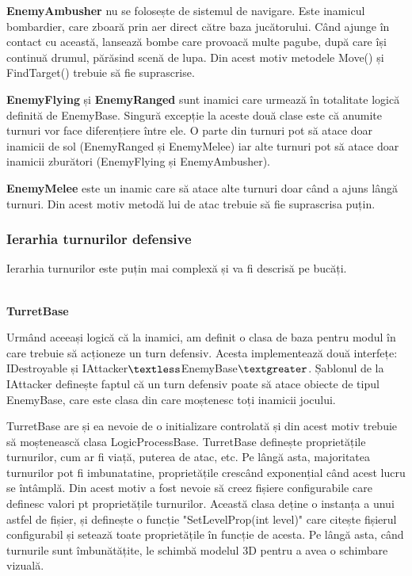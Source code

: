 \documentclass[12pt, a4paper]{article}
\begin{document}
	\textbf{EnemyAmbusher} nu se folosește de sistemul de navigare. Este inamicul bombardier, care zboară prin aer direct către baza jucătorului. Când ajunge în contact cu această, lansează bombe care provoacă multe pagube, după care își continuă drumul, părăsind scenă de lupa. Din acest motiv metodele Move() și FindTarget() trebuie să fie suprascrise.
	\newline
	
	\textbf{EnemyFlying} și \textbf{EnemyRanged} sunt inamici care urmează în totalitate logică definită de EnemyBase. Singură excepție la aceste două clase este că anumite turnuri vor face diferențiere între ele. O parte din turnuri pot să atace doar inamicii de sol (EnemyRanged și EnemyMelee) iar alte turnuri pot să atace doar inamicii zburători (EnemyFlying și EnemyAmbusher).
	\newline
	
	\textbf{EnemyMelee} este un inamic care să atace alte turnuri doar când a ajuns lângă turnuri. Din acest motiv metodă lui de atac trebuie să fie suprascrisa puțin.
	
	
	
	
	
	\subsubsection{Ierarhia turnurilor defensive}
	\label{section: turretHierachy}
	
	Ierarhia turnurilor este puțin mai complexă și va fi descrisă pe bucăți.
	
	\ \\
	\textbf{TurretBase}
	
	Urmând aceeași logică că la inamici, am definit o clasa de baza pentru modul în care trebuie să acționeze un turn defensiv. Acesta implementează două interfețe: IDestroyable și IAttacker$\textless$EnemyBase$\textgreater$. Șablonul de la IAttacker definește faptul că un turn defensiv poate să atace obiecte de tipul EnemyBase, care este clasa din care moștenesc toți inamicii jocului.
	\newline
	
	TurretBase are și ea nevoie de o initializare controlată și din acest motiv trebuie să moștenească clasa LogicProcessBase. TurretBase definește proprietățile turnurilor, cum ar fi viață, puterea de atac, etc. Pe lângă asta, majoritatea turnurilor pot fi imbunatatine, proprietățile crescând exponențial când acest lucru se întâmplă. Din acest motiv a fost nevoie să creez fișiere configurabile care definesc valori pt proprietățile turnurilor. Această clasa deține o instanța a unui astfel de fișier, și definește o funcție "SetLevelProp(int level)" care citește fișierul configurabil și setează toate proprietățile în funcție de acesta. Pe lângă asta, când turnurile sunt îmbunătățite, le schimbă modelul 3D pentru a avea o schimbare vizuală.
	\newline
	
\end{document}

